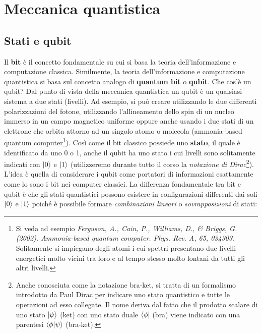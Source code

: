 
\chapter{Meccanica quantistica}

\section{Stati e qubit}

\noindent Il \textbf{bit} è il concetto fondamentale su cui si basa la teoria dell'informazione e computazione classica. Similmente, la teoria dell'informazione e computazione quantistica si basa sul concetto analogo di \textbf{quantum bit} o \textbf{qubit}. Che cos'è un qubit? Dal punto di vista della meccanica quantistica un qubit è un qualsiasi sistema a due stati (livelli). Ad esempio, si può creare utilizzando le due differenti polarizzazioni del fotone, utilizzando l'allineamento dello spin di un nucleo immerso in un campo magnetico uniforme oppure anche usando i due stati di un elettrone che orbita attorno ad un singolo atomo o molecola (ammonia-based quantum computer\footnote{Si veda ad esempio \textit{Ferguson, A., Cain, P., Williams, D., \& Briggs, G. (2002). Ammonia-based quantum computer. Phys. Rev. A, 65, 034303}. Solitamente si impiegano degli atomi i cui spettri presentano due livelli energetici molto vicini tra loro e al tempo stesso molto lontani da tutti gli altri livelli.}). Così come il bit classico possiede uno \textbf{stato}, il quale è identificato da uno 0 o 1, anche il qubit ha uno stato i cui livelli sono solitamente indicati con $\ket{0}$ e $\ket{1}$ (utilizzeremo durante tutto il corso la \textit{notazione di Dirac}\footnote{Anche conosciuta come la notazione bra-ket, si tratta di un formalismo introdotto da Paul Dirac per indicare uno stato quantistico e tutte le operazioni ad esso collegate. Il nome deriva dal fatto che il prodotto scalare di uno stato $\ket{\psi}$ (ket) con uno stato duale $\bra{\phi}$ (bra) viene indicato con una parentesi $\braket{\phi}{\psi}$ (bra-ket).}). L'idea è quella di considerare i qubit come portatori di informazioni esattamente come lo sono i bit nei computer classici. La differenza fondamentale tra bit e qubit è che gli stati quantistici possono esistere in configurazioni differenti dai soli $\ket{0}$ e $\ket{1}$ poiché è possibile formare \textit{combinazioni lineari} o \textit{sovrapposizioni} di stati:

